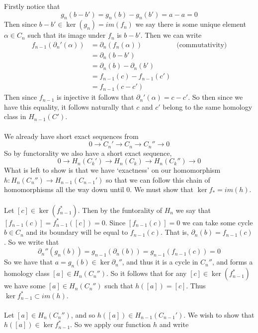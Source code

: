 \documentclass{article}
\theoremstyle{definition}
\begin{document}
    Firstly notice that 
    \[
        g_n(b - b') = g_n(b) - g_n(b') = a - a = 0
    \]
    Then since $b - b' \in \ker(g_n) = im(f_n)$ we say there is some unique element
    $\alpha \in C_n$ such that its image under $f_n$ is $b - b'$.
    Then we can write 
    \begin{align*}
        f_{n-1}(\partial_n'(\alpha)) &= \partial_n(f_n(\alpha)) & \text{(commutativity)} \\
        &=\partial_n(b - b') \\
        &=\partial_n(b) - \partial_n(b') \\
        &=f_{n-1}(c) - f_{n-1}(c') \\
        &=f_{n-1}(c - c')
    \end{align*}
    Then since $f_{n-1}$ is injective it follows that $\partial_n'(\alpha) = c - c'$.
    So then since we have this equality, it follows naturally that $c$ and $c'$ belong to the 
    same homology class in $H_{n-1}(C')$. \\\\
    We already have short exact sequences from 
    \[
        0 \rightarrow C_n' \rightarrow C_n \rightarrow C_n'' \rightarrow 0
    \]
    So by functorality we also have a short exact sequence,
    \[
        0 \rightarrow H_n(C_k') \rightarrow H_n(C_k) \rightarrow H_n(C_k'') \rightarrow 0
    \]
    What is left to show is that we have `exactness' on our homomorphism $h:H_n(C_n'') \rightarrow H_{n-1}(C_{n-1}')$
    so that we can follow this chain of homomorphisms all the way down until 0.
    We must show that $\ker f_* = im(h)$.\\\\
    \fbox{$\subset$} Let $[c] \in \ker(f_{n-1}^*)$. Then by the funtorality of $H_n$ we say that 
    $[f_{n-1}(c)] = f_{n-1}^*([c]) = 0$. 
    Since $[f_{n-1}(c)] = 0$ we can take some cycle $b \in C_n$ and its boundary 
    will be equal to $f_{n-1}(c)$. That is, $\partial_n(b) = f_{n-1}(c)$.
    So we write that 
    \[
        \partial_n''(g_n(b)) = g_{n-1}(\partial_n(b)) = g_{n-1}(f_{n-1}(c)) = 0
    \]
    So we have that $a = g_n(b) \in \ker \partial_n''$, and thus it is a cycle in $C_n''$,
    and forms a homology class $[a] \in H_{n}(C_n'')$. So it follows that for any $[c] \in \ker(f_{n-1}^*)$
    we have some $[a] \in H_{n}(C_n'')$ such that $h([a]) = [c]$. Thus $\ker f_{n-1}^* \subset im(h)$.\\\\
    \fbox{$\supset$} Let $[a] \in H_n(C_n'')$, and so $h([a]) \in H_{n-1}(C_{n-1}')$.
    We wish to show that $h([a]) \in \ker f_{n-1}^*$. So we apply our function $h$ and write 
\end{document}
